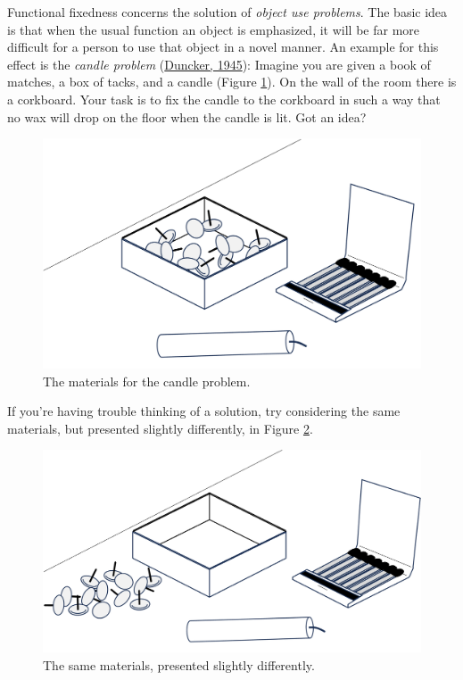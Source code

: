 \documentclass[
]{krantz}
\begin{document}
Functional fixedness concerns the solution of \emph{object use problems}. The basic idea is that when the usual function an object is emphasized, it will be far more difficult for a person to use that object in a novel manner. An example for this effect is the \emph{candle problem} (\protect\hyperlink{ref-duncker1945problem}{Duncker, 1945}): Imagine you are given a book of matches, a box of tacks, and a candle (Figure \ref{fig:candle1}). On the wall of the room there is a corkboard. Your task is to fix the candle to the corkboard in such a way that no wax will drop on the floor when the candle is lit. Got an idea?

\begin{figure}

{\centering \includegraphics[width=0.6\linewidth]{images/ch10/candle1} 

}

\caption{The materials for the candle problem.}\label{fig:candle1}
\end{figure}

If you're having trouble thinking of a solution, try considering the same materials, but presented slightly differently, in Figure \ref{fig:candle2}.

\begin{figure}

{\centering \includegraphics[width=0.6\linewidth]{images/ch10/candle2} 

}

\caption{The same materials, presented slightly differently.}\label{fig:candle2}
\end{figure}
\end{document}
